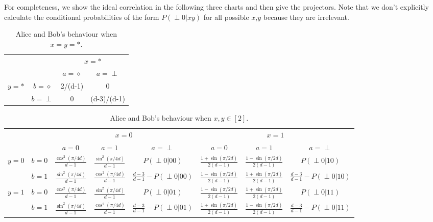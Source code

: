 \documentclass[11pt,letterpaper]{article}
\newcommand{\1}{\mathbb{1}}
\newcommand{\pr}[2]{P(#1|#2)}
\theoremstyle{definition}
\begin{document}
For completeness, we show the ideal correlation in the following three charts and then give the projectors. 
Note that we don't explicitly calculate the conditional probabilities of the form $\pr{\perp 0}{xy}$ for all possible $x$,$y$ 
because they are irrelevant.
\begin{table}[H]
\begin{center}
\begin{tabular}{|c|c||c|c|}
\hline
\multicolumn{2}{|c|}{} &
\multicolumn{2}{|c|}{$x=\ast$}\\
\cline{3-4}
\multicolumn{2}{|c|}{} &$a = \diamond$ & $a = \perp$ \\
\hline
\hline
\multirow{2}{*}{$y = \ast$} & $b=\diamond$ & 2/(d-1) & 0 \\
\cline{2-4}
&$b=\perp$ & 0 & (d-3)/(d-1) \\
\hline
\end{tabular}
\caption{Alice and Bob's behaviour when $x=y=\ast$.}
\end{center}
\end{table}

\begin{table}[H]
\begin{center}
\begin{tabular}{|c|c||c|c|c|c|c|c|}
\hline
\multicolumn{2}{|c|}{} &
\multicolumn{3}{|c|}{$x=0$}&
\multicolumn{3}{|c|}{$x=1$} \\
\cline{3-8}
\multicolumn{2}{|c|}{} &
$a = 0$ & $a=1$ & $a=\perp$ &
$a = 0$ & $a=1$ & $a=\perp$\\
\hline
\hline
\multirow{2}{*}{$y = 0$} & $b=0$ & $\frac{\cos^2(\pi/4d)}{d-1}$ & $\frac{\sin^2(\pi/4d)}{d-1}$ & \small $\pr{\perp0}{00}$ 
& $\frac{1+\sin(\pi/2d)}{2(d-1)}$ & $\frac{1-\sin(\pi/2d)}{2(d-1)}$ & \small  $\pr{\perp0}{10}$ \\
\cline{2-8}
&$b=1$ & $\frac{\sin^2(\pi/4d)}{d-1}$ & $\frac{\cos^2(\pi/4d)}{d-1}$ & $\frac{d-3}{d-1}-\pr{\perp0}{00}$ 
&  $\frac{1-\sin(\pi/2d)}{2(d-1)}$ & $\frac{1+\sin(\pi/2d)}{2(d-1)}$ & \small $\frac{d-3}{d-1} - \pr{\perp0}{10}$  \\
\hline
\multirow{2}{*}{$y = 1$} & $b=0$ & $\frac{\cos^2(\pi/4d)}{d-1}$ & $\frac{\sin^2(\pi/4d)}{d-1}$ & \small $\pr{\perp0}{01}$ & 
$ \frac{1-\sin(\pi/2d)}{2(d-1)}$ & $ \frac{1+\sin(\pi/2d)}{2(d-1)}$ & \small $\pr{\perp 0}{11}$  \\
\cline{2-8}
&$b=1$ & $\frac{\sin^2(\pi/4d)}{d-1}$ & $\frac{\cos^2(\pi/4d)}{d-1}$ & \small $\frac{d-3}{d-1}-\pr{\perp0}{01}$ &  
$ \frac{1+\sin(\pi/2d)}{2(d-1)}$ & $ \frac{1-\sin(\pi/2d)}{2(d-1)}$ & \small $\frac{d-3}{d-1}- \pr{\perp 0}{11}$ \\
\hline
\end{tabular}
\end{center}
\caption{Alice and Bob's behaviour when $x,y \in [2]$.}
\end{table}
\end{document}
